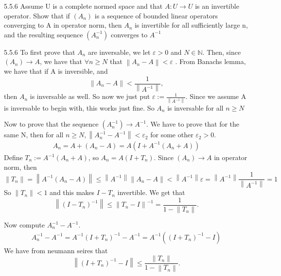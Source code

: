 \documentclass[a4paper,norsk]{article}
\renewcommand{\geq}{\geqslant}
\renewcommand{\leq}{\leqslant}
\renewcommand{\epsilon}{\varepsilon}
\begin{document}
\begin{oppgavebox}{5.5.6}{}
Assume U is a complete normed space and that $ A : U \to U $ is an invertible operator. Show that if $ \left( A_n \right)  $ is a sequence of bounded linear operators converging to A in operator norm, then $ A_n $ is invertible for all sufficiently large n, and the resulting sequence $ \left( A_n ^{-1}  \right)  $ converges to $ A ^{-1}  $ 

\begin{proofbox}{5.5.6}{}
    To first prove that $ A_n $ are inversable, we let $ \epsilon > 0 $ and $ N \in \mathbb{N} $. Then, since $ \left( A_n \right) \to A  $, we have that $ \forall n \geq N $  that $ \left\lVert A_n - A \right\rVert < \epsilon  $ . From Banachs lemma, we have that if A is inversible, and 
    \[
        \left\lVert A_n - A \right\rVert < \frac{ 1 }{ \left\lVert A ^{-1}  \right\rVert  },
    \]
    then $ A_n $ is inversable as well. So now we just put $ \epsilon  := \frac{ 1 }{ \left\lVert A ^{-1}  \right\rVert  } $. Since we assume A is inversable to begin with, this works just fine. So $ A_n $ is inversable for all $ n \geq N $



    Now to prove that the sequence $ \left( A_n ^{-1}  \right) \to A ^{-1}   $. We have to prove that for the same N, then for all $ n \geq N, \left\lVert A_n ^{-1 } - A ^{-1}   \right\rVert < \epsilon _2  $ for some other $ \epsilon _2 > 0 $. 
    \begin{align*}
        A_n  = A + \left( A_n - A \right) = A \left( I + A ^{-1} \left( A_n + A \right)   \right) 
    \end{align*}
    Define $ T_n := A ^{-1} \left( A_n + A \right) $, so $ A_n = A \left( I + T_n \right)  $. Since $ \left( A_n  \right) \to A $ in operator norm, then
    \[
        \left\lVert T_n \right\rVert = \left\lVert A ^{-1} \left( A_n - A \right)   \right\rVert \leq \left\lVert A ^{-1}  \right\rVert \left\lVert A_n - A \right\rVert <  \left\lVert A ^{-1}  \right\rVert \epsilon  = \left\lVert A ^{-1}  \right\rVert \frac{ 1 }{ \left\lVert A ^{-1}  \right\rVert }  = 1
    \]
    So $ \left\lVert T_n \right\rVert < 1 $ and this makes $ I - T_n $ invertible. We get that
    \[
        \left\lVert \left( I - T_n \right) ^{-1}  \right\rVert \leq \left\lVert T_n - I \right\rVert ^{-1} = \frac{ 1 }{ 1 - \left\lVert T_n \right\rVert  }.
    \]

    Now compute $ A_n ^{-1} - A ^{-1}   $. 
    \begin{align*}
        A_n ^{-1} - A ^{-1} = A ^{-1}  \left( I + T_n \right) ^{-1}   - A ^{-1} = A ^{-1} \left( \left( I + T_n \right) ^{-1} - I  \right)   
    \end{align*}
    We have from neumann seires that 
    \[
        \left\lVert \left( I + T_n \right) ^{-1} - I  \right\rVert \leq \frac{ \left\lVert T_n \right\rVert  }{ 1 - \left\lVert T_n \right\rVert  }.
    \]


\end{proofbox}
\end{oppgavebox}
\end{document}
